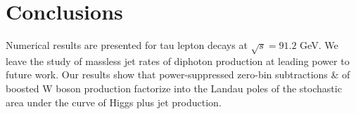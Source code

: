 \section{Conclusions}\label{sec:conclusions}

Numerical results are presented for tau lepton decays at $\sqrt{s} =
91.2$ GeV. We leave the study of massless jet rates of diphoton
production at leading power to future work. Our results show that
power-suppressed zero-bin subtractions & of boosted W boson production
factorize into the Landau poles of the stochastic area under the curve
of Higgs plus jet production.

